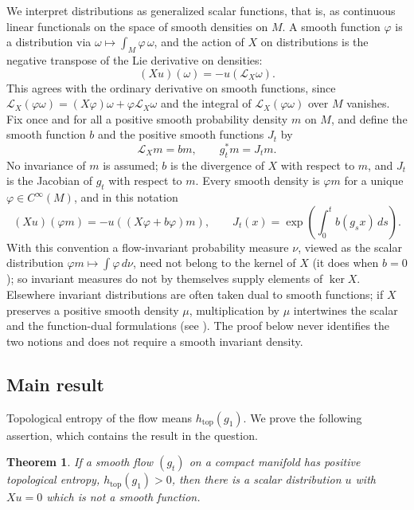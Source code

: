 \documentclass[11pt]{article}
\newtheorem{theorem}{Theorem}[section]
\theoremstyle{remark}
\newcommand{\LX}{\mathcal L_X}
\newcommand{\htop}{h_{\mathrm{top}}}
\begin{document}
We interpret distributions as generalized scalar functions, that is,
as continuous linear functionals on the space of smooth densities on
\(M\).  A smooth function \(\varphi\) is a distribution via
\(\omega\mapsto\int_M\varphi\,\omega\), and the action of \(X\) on
distributions is the negative transpose of the Lie derivative on
densities:
\[
 (Xu)(\omega)=-u(\mathcal L_X\omega).
\]
This agrees with the ordinary derivative on smooth functions, since
\(\LX(\varphi\omega)=(X\varphi)\omega+\varphi\LX\omega\) and the
integral of \(\LX(\varphi\omega)\) over \(M\) vanishes.
Fix once and for all a positive smooth probability density \(m\) on
\(M\), and define the smooth function \(b\) and the positive smooth
functions \(J_t\) by
\[
 \mathcal L_Xm=bm,\qquad g_t^*m=J_tm .
\]
No invariance of \(m\) is assumed; \(b\) is the divergence of \(X\)
with respect to \(m\), and \(J_t\) is the Jacobian of \(g_t\)
with respect to \(m\).  Every smooth density is \(\varphi m\) for a
unique \(\varphi\in C^\infty(M)\), and in this notation
\begin{equation}\label{eq:scalar}
 (Xu)(\varphi m)=-u((X\varphi+b\varphi)m),\qquad
 J_t(x)=\exp\!\left(\int_0^t b(g_sx)\,ds\right).
\end{equation}
With this convention a flow-invariant probability measure \(\nu\),
viewed as the scalar distribution \(\varphi m\mapsto\int\varphi\,d\nu\),
need not belong to the kernel of \(X\) (it does when \(b=0\)); so
invariant measures do not by themselves supply elements of
\(\ker X\).
Elsewhere invariant distributions are often taken dual to smooth
functions; if \(X\) preserves a positive smooth density \(\mu\),
multiplication by \(\mu\) intertwines the scalar and the
function-dual formulations (see \cite[Section~3]{Forni2008}).  The
proof below never identifies the two notions and does not require a
smooth invariant density.

\subsection{Main result}

Topological entropy of the flow means \(\htop(g_1)\).
We prove the following assertion, which contains the result in the
question.

\begin{theorem}\label{thm:obstruction}
If a smooth flow \((g_t)\) on a compact manifold has positive
topological entropy, \(\htop(g_1)>0\), then there is a scalar
distribution \(u\) with \(Xu=0\) which is not a smooth function.
\end{theorem}
\end{document}
